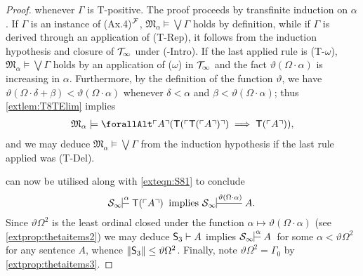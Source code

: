 \documentclass[UKenglish,cleveref,DIV=12]{scrartcl}
\let\forall\forallAlt
\theoremstyle{definition}
\theoremstyle{definition}
\begin{document}
\begin{proof}
whenever $\Gamma$ is T-positive. The
proof proceeds by transfinite induction on $\alpha$. If $\Gamma$ is an instance
of (Ax.4)$^{\mathcal{F}}$, $\mathfrak{M}_\alpha\models\bigvee\Gamma$ holds by definition,
while if $\Gamma$ is derived through an application of (T-Rep), it follows from
the induction hypothesis and closure of $\mathcal{T}_\infty$ under (-Intro). If the last applied rule is (T-$\omega$), $\mathfrak{M}_\alpha\models\bigvee\Gamma$ holds by an application of
($\omega$) in $\mathcal{T}_\infty$ and the fact $\vartheta(\Omega\cdot\alpha)$ is increasing in $\alpha$.
Furthermore, by the definition of the function $\vartheta$, we have
$\vartheta(\Omega\cdot\delta+\beta)<\vartheta(\Omega\cdot\alpha)$ whenever
$\delta<\alpha$ and $\beta<\vartheta(\Omega\cdot\alpha)$; thus
\cref{extlem:T8TElim} implies
\begin{align*}
  \mathfrak{M}_\alpha\models\forall\gn A(\T(\gn{\T(\gn A)})\implies \T(\gn A)),
\end{align*}
and we may deduce $\mathfrak{M}_\alpha\models\bigvee\Gamma$ from the induction
hypothesis if the last rule applied was (T-Del).

 can now be utilised along with \cref{exteqn:S81} to conclude
\begin{align*}%
 \theoryinf S\prov\alpha{}{\T(\gn A)}\text{ implies }\theoryinf
S\prov{\vartheta(\Omega\cdot\alpha)}{} {A.}
\end{align*}
Since $\vartheta\Omega^2$ is the least ordinal closed under the function
$\alpha\mapsto\vartheta(\Omega\cdot\alpha)$ (see \cref{extprop:thetaitems2}) we
may deduce $\mathsf{S}_3\vdash A$ implies $\theoryinf S\prov\alpha{}A$ for
some $\alpha<\vartheta\Omega^2$ for any sentence $A$, whence $\lVert{\mathsf{S}_3}\rVert\le\vartheta\Omega^2$. Finally, note $\vartheta\Omega^2=\Gamma_0$
by \cref{extprop:thetaitems3}.
\end{proof}
\end{document}
